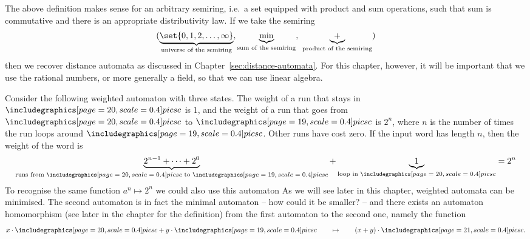 The above definition makes sense for an arbitrary semiring, i.e.~a set equipped with product and sum operations, such that sum is commutative and there is an appropriate distributivity law. If we take the semiring 
\begin{align*}
(\underbrace{\set{0,1,2,\ldots,\infty}}_{\text{universe of the semiring}}, \underbrace{\min}_{\text{sum of the semiring}}, \ \underbrace{+}_{\text{product of the semiring}})	
\end{align*}
then we recover distance automata as discussed in Chapter~\ref{sec:distance-automata}. For this chapter, however, it will be important that we use the rational numbers, or more generally a  field, so that we can use linear algebra.


\begin{example}
Consider the following weighted automaton with three states.
 The weight of a run that stays in $\whiteball$  is  $1$, and the weight of a run that goes from $\whiteball$ to $\blackball$  is $2^n$, where $n$ is the number of times the run loops around $\blackball$. Other runs have cost zero. If the input word has length $n$, then the weight of the word is
\begin{align*}
	\underbrace{2^{n-1} + \cdots +2^{0}}_{\text{runs from $\whiteball$ to $\blackball$}} + \underbrace{1}_{\text{loop in $\whiteball$}} = 2^n
\end{align*}
To recognise the same function $a^n \mapsto 2^n$ we could also use this automaton
As we will see later in this chapter, weighted automata can be minimised. The second automaton is in fact the minimal automaton -- how could it be smaller? -- and there exists an automaton homomorphism  (see later in the chapter for the definition) from  the first automaton to the second one, namely the function
\begin{align*}
  x \cdot \whiteball + y \cdot \blackball \qquad \mapsto \qquad (x+y) \cdot \blueball.
\end{align*}



\end{example}

